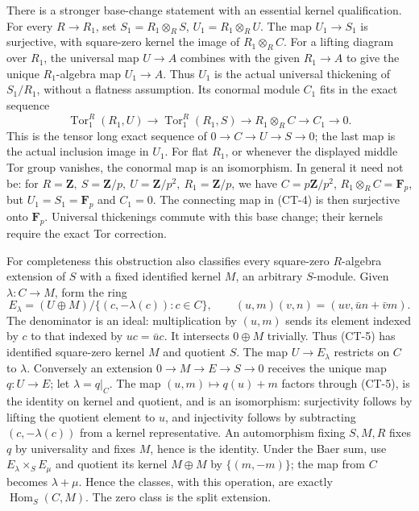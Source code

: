 There is a stronger base-change statement with an essential kernel qualification. For every \(R\to R_1\), set \(S_1=R_1\otimes_RS\), \(U_1=R_1\otimes_RU\). The map \(U_1\to S_1\) is surjective, with square-zero kernel the image of \(R_1\otimes_RC\). For a lifting diagram over \(R_1\), the universal map \(U\to A\) combines with the given \(R_1\to A\) to give the unique \(R_1\)-algebra map \(U_1\to A\). Thus \(U_1\) is the actual universal thickening of \(S_1/R_1\), without a flatness assumption. Its conormal module \(C_1\) fits in the exact sequence \[
\operatorname{Tor}_1^R(R_1,U)\longrightarrow
\operatorname{Tor}_1^R(R_1,S)\longrightarrow
R_1\otimes_RC\longrightarrow C_1\longrightarrow0.
\tag{CT-4}
\] This is the tensor long exact sequence of \(0\to C\to U\to S\to0\); the last map is the actual inclusion image in \(U_1\). For flat \(R_1\), or whenever the displayed middle Tor group vanishes, the conormal map is an isomorphism. In general it need not be: for \(R=\mathbf Z,\ S=\mathbf Z/p,\ U=\mathbf Z/p^2,\ R_1=\mathbf Z/p\), we have \(C=p\mathbf Z/p^2\), \(R_1\otimes_RC=\mathbf F_p\), but \(U_1=S_1=\mathbf F_p\) and \(C_1=0\). The connecting map in (CT-4) is then surjective onto \(\mathbf F_p\). Universal thickenings commute with this base change; their kernels require the exact Tor correction.

For completeness this obstruction also classifies every square-zero \(R\)-algebra extension of \(S\) with a fixed identified kernel \(M\), an arbitrary \(S\)-module. Given \(\lambda:C\to M\), form the ring \[
E_\lambda=(U\oplus M)/
\{(c,-\lambda(c)):c\in C\},\qquad
(u,m)(v,n)=(uv,\bar u n+\bar v m).
\tag{CT-5}
\] The denominator is an ideal: multiplication by \((u,m)\) sends its element indexed by \(c\) to that indexed by \(uc=\bar u c\). It intersects \(0\oplus M\) trivially. Thus (CT-5) has identified square-zero kernel \(M\) and quotient \(S\). The map \(U\to E_\lambda\) restricts on \(C\) to \(\lambda\). Conversely an extension \(0\to M\to E\to S\to0\) receives the unique map \(q:U\to E\); let \(\lambda=q|_C\). The map \((u,m)\mapsto q(u)+m\) factors through (CT-5), is the identity on kernel and quotient, and is an isomorphism: surjectivity follows by lifting the quotient element to \(u\), and injectivity follows by subtracting \((c,-\lambda(c))\) from a kernel representative. An automorphism fixing \(S,M,R\) fixes \(q\) by universality and fixes \(M\), hence is the identity. Under the Baer sum, use \(E_\lambda\times_SE_\mu\) and quotient its kernel \(M\oplus M\) by \(\{(m,-m)\}\); the map from \(C\) becomes \(\lambda+\mu\). Hence the classes, with this operation, are exactly \(\operatorname{Hom}_S(C,M)\). The zero class is the split extension.

